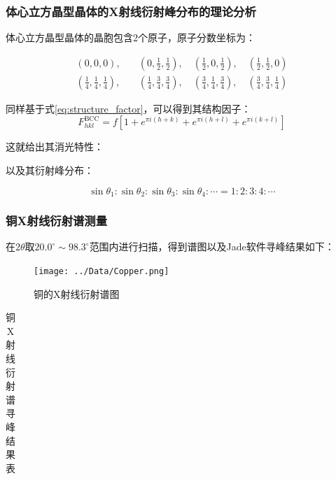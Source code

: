 \documentclass{thuemp}
\begin{document}
\subsubsection{体心立方晶型晶体的X射线衍射峰分布的理论分析}

体心立方晶型晶体的晶胞包含2个原子，原子分数坐标为：

\begin{align*}
(0,0,0),\quad &(0,\frac{1}{2},\frac{1}{2}),\quad (\frac{1}{2},0,\frac{1}{2}),\quad (\frac{1}{2},\frac{1}{2},0) \\
(\frac{1}{4},\frac{1}{4},\frac{1}{4}),\quad &(\frac{1}{4},\frac{3}{4},\frac{3}{4}),\quad (\frac{3}{4},\frac{1}{4},\frac{3}{4}),\quad (\frac{3}{4},\frac{3}{4},\frac{1}{4})
\end{align*}

同样基于式\ref{eq:structure_factor}，可以得到其结构因子：
\begin{equation}
    F_{hkl}^{\text{BCC}} = f \left[1 + e^{\pi i (h+k)} + e^{\pi i (h+l)} + e^{\pi i (k+l)}\right]
    \label{eq:bcc_struct_fac}
\end{equation}

这就给出其消光特性：

以及其衍射峰分布：

\begin{equation}
    \sin{\theta_1} : \sin{\theta_2} :\sin{\theta_3} : \sin{\theta_4} : \cdots = 1 : 2 : 3 : 4 : \cdots
    \label{eq:bcc_diff_patt}
\end{equation}

\subsubsection{铜X射线衍射谱测量}

在$2\theta$取$20.0^\circ \sim 98.3^\circ$范围内进行扫描，得到谱图以及Jade软件寻峰结果如下：

\begin{figure}[H]
    \centering
    \texttt{[image: ../Data/Copper.png]}
    \caption{铜的X射线衍射谱图}
    \label{fig:cu_xrd}
\end{figure}


\begin{table}
    \centering
    \captionnamefont{\wuhao\bf\heiti}
    \captiontitlefont{\wuhao\bf\heiti}
    \caption{铜X射线衍射谱寻峰结果表}
    \label{tab:cu_xrd}
    \liuhao
    \begin{tabular}{ccccc}
        \toprule
        \midrule
        \bottomrule
    \end{tabular}
\end{table}
\end{document}
